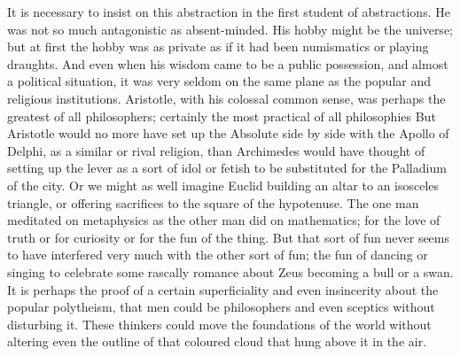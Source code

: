 It is necessary to insist on this abstraction in the first student of abstractions. He was not so much antagonistic as absent-minded. His hobby might be the universe; but at first the hobby was as private as if it had been numismatics or playing draughts. And even when his wisdom came to be a public possession, and almost a political situation, it was very seldom on the same plane as the popular and religious institutions. Aristotle, with his colossal common sense, was perhaps the greatest of all philosophers; certainly the most practical of all philosophies But Aristotle would no more have set up the Absolute side by side with the Apollo of Delphi, as a similar or rival religion, than Archimedes would have thought of setting up the lever as a sort of idol or fetish to be substituted for the Palladium of the city. Or we might as well imagine Euclid building an altar to an isosceles triangle, or offering sacrifices to the square of the hypotenuse. The one man meditated on metaphysics as the other man did on mathematics; for the love of truth or for curiosity or for the fun of the thing. But that sort of fun never seems to have interfered very much with the other sort of fun; the fun of dancing or singing to celebrate some rascally romance about Zeus becoming a bull or a swan. It is perhaps the proof of a certain superficiality and even insincerity about the popular polytheism, that men could be philosophers and even sceptics without disturbing it. These thinkers could move the foundations of the world without altering even the outline of that coloured cloud that hung above it in the air.

